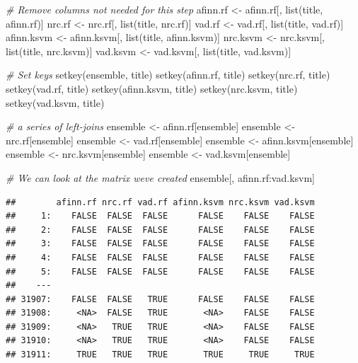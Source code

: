 \documentclass[
]{article}
\newenvironment{Shaded}{\begin{snugshade}}{\end{snugshade}}
\newcommand{\CommentTok}[1]{\textcolor[rgb]{0.56,0.35,0.01}{\textit{#1}}}
\newcommand{\FunctionTok}[1]{\textcolor[rgb]{0.00,0.00,0.00}{#1}}
\newcommand{\NormalTok}[1]{#1}
\newcommand{\OtherTok}[1]{\textcolor[rgb]{0.56,0.35,0.01}{#1}}
\newcommand{\SpecialCharTok}[1]{\textcolor[rgb]{0.00,0.00,0.00}{#1}}
\begin{document}
\begin{Shaded}
\begin{Highlighting}[]
\CommentTok{\# Remove columns not needed for this step}
\NormalTok{afinn.rf }\OtherTok{\textless{}{-}}\NormalTok{ afinn.rf[, }\FunctionTok{list}\NormalTok{(title, afinn.rf)]}
\NormalTok{nrc.rf }\OtherTok{\textless{}{-}}\NormalTok{ nrc.rf[, }\FunctionTok{list}\NormalTok{(title, nrc.rf)]}
\NormalTok{vad.rf }\OtherTok{\textless{}{-}}\NormalTok{ vad.rf[, }\FunctionTok{list}\NormalTok{(title, vad.rf)]}
\NormalTok{afinn.ksvm }\OtherTok{\textless{}{-}}\NormalTok{ afinn.ksvm[, }\FunctionTok{list}\NormalTok{(title, afinn.ksvm)]}
\NormalTok{nrc.ksvm }\OtherTok{\textless{}{-}}\NormalTok{ nrc.ksvm[, }\FunctionTok{list}\NormalTok{(title, nrc.ksvm)]}
\NormalTok{vad.ksvm }\OtherTok{\textless{}{-}}\NormalTok{ vad.ksvm[, }\FunctionTok{list}\NormalTok{(title, vad.ksvm)]}

\CommentTok{\# Set keys}
\FunctionTok{setkey}\NormalTok{(ensemble, title)}
\FunctionTok{setkey}\NormalTok{(afinn.rf, title)}
\FunctionTok{setkey}\NormalTok{(nrc.rf, title)}
\FunctionTok{setkey}\NormalTok{(vad.rf, title)}
\FunctionTok{setkey}\NormalTok{(afinn.ksvm, title)}
\FunctionTok{setkey}\NormalTok{(nrc.ksvm, title)}
\FunctionTok{setkey}\NormalTok{(vad.ksvm, title)}

\CommentTok{\# a series of left{-}joins}
\NormalTok{ensemble }\OtherTok{\textless{}{-}}\NormalTok{ afinn.rf[ensemble]}
\NormalTok{ensemble }\OtherTok{\textless{}{-}}\NormalTok{ nrc.rf[ensemble]}
\NormalTok{ensemble }\OtherTok{\textless{}{-}}\NormalTok{ vad.rf[ensemble]}
\NormalTok{ensemble }\OtherTok{\textless{}{-}}\NormalTok{ afinn.ksvm[ensemble]}
\NormalTok{ensemble }\OtherTok{\textless{}{-}}\NormalTok{ nrc.ksvm[ensemble]}
\NormalTok{ensemble }\OtherTok{\textless{}{-}}\NormalTok{ vad.ksvm[ensemble]}

\CommentTok{\# We can look at the matrix we\textquotesingle{}ve created}
\NormalTok{ensemble[, afinn.rf}\SpecialCharTok{:}\NormalTok{vad.ksvm]}
\end{Highlighting}
\end{Shaded}

\begin{verbatim}
##        afinn.rf nrc.rf vad.rf afinn.ksvm nrc.ksvm vad.ksvm
##     1:    FALSE  FALSE  FALSE      FALSE    FALSE    FALSE
##     2:    FALSE  FALSE  FALSE      FALSE    FALSE    FALSE
##     3:    FALSE  FALSE  FALSE      FALSE    FALSE    FALSE
##     4:    FALSE  FALSE  FALSE      FALSE    FALSE    FALSE
##     5:    FALSE  FALSE  FALSE      FALSE    FALSE    FALSE
##    ---                                                    
## 31907:    FALSE  FALSE   TRUE      FALSE    FALSE    FALSE
## 31908:     <NA>  FALSE   TRUE       <NA>    FALSE    FALSE
## 31909:     <NA>   TRUE   TRUE       <NA>    FALSE    FALSE
## 31910:     <NA>   TRUE   TRUE       <NA>    FALSE    FALSE
## 31911:     TRUE   TRUE   TRUE       TRUE     TRUE     TRUE
\end{verbatim}
\end{document}
